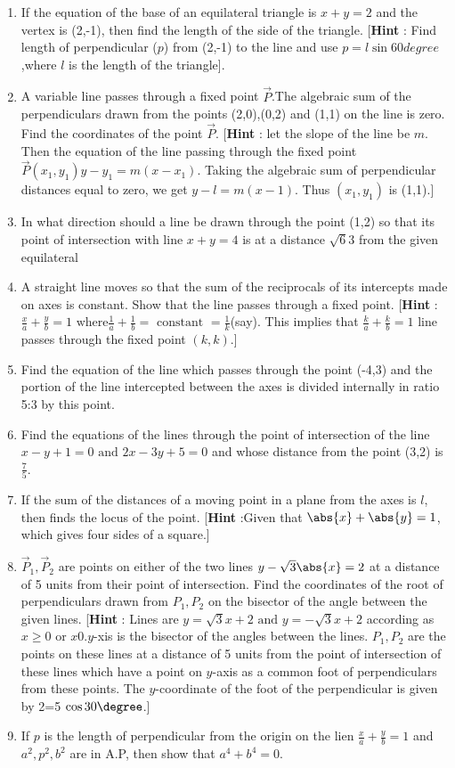  \begin{enumerate}[resume]
\item If the equation of the base of an equilateral triangle is $x+y=2$ and the vertex is (2,-1), then find the length of the side of the triangle. 
[\textbf{Hint} : Find length of perpendicular ($p$) from (2,-1) to the line and use $p=l \sin 60degree$,where $l$ is the length of the triangle].
\item A variable line passes through a fixed point $\vec{P}$.The algebraic sum of the perpendiculars drawn from the points (2,0),(0,2) and (1,1) on the line is zero. Find the coordinates of the point $\vec{P}$.  
[\textbf{Hint} : let the slope of the line be $m$. Then the equation of the line passing through the fixed point $\vec{P}(x_1,y_1) y-y_1=m(x-x_1)$. Taking the algebraic sum of perpendicular distances equal to zero, we get $y-l=m(x-1)$. Thus $(x_1,y_1)$ is (1,1).]
\item In what direction should a line be drawn through the point (1,2) so that its point of intersection with line $x+y=4$ is at a distance $\sqrt{6}{3}$ from the given equilateral    
\item A straight line moves so that the sum of the reciprocals of its intercepts made on axes is constant. Show that the line passes through a fixed point. [\textbf{Hint} : $\frac{x}{a}+\frac{y}{b}=1\text{ where} \frac{1}{a}+\frac{1}{b}=\text{ constant }=\frac{1}{k}$(say). This implies that $\frac{k}{a}+\frac{k}{b}=1$ line passes through the fixed point $(k,k)$.]
\item Find the equation of the line which passes through the point (-4,3) and the portion of the line intercepted between the axes is divided internally in ratio 5:3 by this point.
\item Find the equations of the lines through the point of intersection of the line $x-y+1=0 \text{ and }2x-3y+5=0$ and whose distance from the point (3,2) is $\frac{7}{5}$.
\item If the sum of the distances of a moving point in a plane from the axes is $l$, then finds the locus of the point. [\textbf{Hint} :Given that $\abs{x}+\abs{y}=1$, which  gives four  sides of a square.] 
\item $\vec{P}_1,\vec{P}_2$ are points on either of the two lines $y-\sqrt{3}\abs{x}=2$ at a distance of 5 units from their point of intersection. Find the coordinates of the root of perpendiculars drawn from $P_1, P_2$ on the bisector of the angle between the given lines.
[\textbf{Hint} : Lines are $y=\sqrt{3}x+2 \text{ and }y=-\sqrt{3}x+2$ according as $x\geq0$ or $x0. y$-xis is the bisector of the angles between the lines. $P_1, P_2$ are the points on these lines at a distance of 5 units from the point of intersection of these lines which have a point on $y$-axis as a common foot of perpendiculars from these points. The $y$-coordinate of the foot of the perpendicular is given by 2=5 $\cos{30\degree}$.]
\item If $p$ is the length of perpendicular from the origin on the lien $\frac{x}{a}+\frac{y}{b}=1$ and $a^2,p^2,b^2$ are in A.P, then show that $a^4+b^4=0$.
\end{enumerate}
